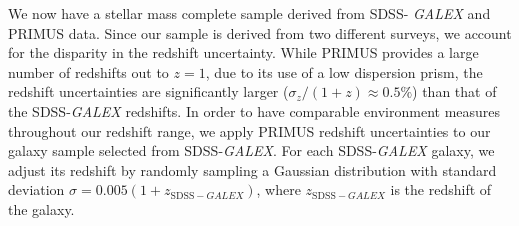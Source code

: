 \documentclass{emulateapj}
\begin{document}
We now have a stellar mass complete sample derived from SDSS-{\em
  GALEX} and PRIMUS data. Since our sample is derived from two
different surveys, we account for the disparity in the redshift
uncertainty. While PRIMUS provides a large number of redshifts out to
$z = 1$, due to its use of a low dispersion prism, the redshift
uncertainties are significantly larger ($\sigma_{z}/(1+z) \approx 0.5
\%$) than that of the SDSS-{\em GALEX} redshifts. In order to have
comparable environment measures throughout our redshift range, we
apply PRIMUS redshift uncertainties to our galaxy sample selected from
SDSS-{\em GALEX}. For each SDSS-{\em GALEX} galaxy, we adjust its
redshift by randomly sampling a Gaussian distribution with standard
deviation $\sigma = 0.005 (1+z_{\mathrm{SDSS}-GALEX})$, where
$z_{\mathrm{SDSS}-GALEX}$ is the redshift of the galaxy.

\end{document}
